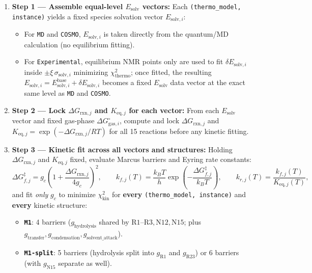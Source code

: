 \documentclass[11pt,a4paper]{article}
\begin{document}
\begin{enumerate}[leftmargin=1.8em]
    \item \textbf{Step 1 --- Assemble equal-level $E_{\text{solv}}$ vectors:} Each \texttt{(thermo\_model, instance)} yields a fixed species solvation vector $E_{\text{solv}, i}$:
    \begin{itemize}[leftmargin=1.5em]
        \item For \texttt{MD} and \texttt{COSMO}, $E_{\text{solv}, i}$ is taken directly from the quantum/MD calculation (no equilibrium fitting).
        \item For \texttt{Experimental}, equilibrium NMR points only are used to fit $\delta E_{\text{solv}, i}$ inside $\pm \xi\,\sigma_{\text{solv}, i}$ minimizing $\chi^2_{\text{thermo}}$; once fitted, the resulting $E_{\text{solv}, i} = E_{\text{solv}, i}^{\text{base}} + \delta E_{\text{solv}, i}$ becomes a fixed $E_{\text{solv}}$ data vector at the exact same level as \texttt{MD} and \texttt{COSMO}.
    \end{itemize}
    \item \textbf{Step 2 --- Lock $\Delta G_{\text{rxn}, j}$ and $K_{\text{eq}, j}$ for each vector:} From each $E_{\text{solv}}$ vector and fixed gas-phase $\Delta G_{\text{gas}, i}^\circ$, compute and lock $\Delta G_{\mathrm{rxn}, j}$ and $K_{\mathrm{eq}, j} = \exp(-\Delta G_{\mathrm{rxn}, j}/RT)$ for all 15 reactions before any kinetic fitting.
    \item \textbf{Step 3 --- Kinetic fit across all vectors and structures:} Holding $\Delta G_{\mathrm{rxn}, j}$ and $K_{\mathrm{eq}, j}$ fixed, evaluate Marcus barriers and Eyring rate constants:
    \[
        \Delta G_{f, j}^\ddagger = g_c \left(1 + \frac{\Delta G_{\mathrm{rxn}, j}}{4 g_c}\right)^2,
        \qquad
        k_{f, j}(T) = \frac{k_B T}{h} \exp\!\left(-\frac{\Delta G_{f, j}^\ddagger}{k_B T}\right),
        \qquad
        k_{r, j}(T) = \frac{k_{f, j}(T)}{K_{\mathrm{eq}, j}(T)},
    \]
    and fit \emph{only} $g_c$ to minimize $\chi^2_{\text{kin}}$ for \textbf{every} \texttt{(thermo\_model, instance)} and \textbf{every} kinetic structure:
    \begin{itemize}[leftmargin=1.5em]
        \item \textbf{\texttt{M1}}: 4 barriers ($g_{\text{hydrolysis}}$ shared by $\text{R1}$--$\text{R3}, \text{N12}, \text{N15}$; plus $g_{\text{transfer}}, g_{\text{condensation}}, g_{\text{solvent\_attack}}$).
        \item \textbf{\texttt{M1-split}}: 5 barriers (hydrolysis split into $g_{\text{R1}}$ and $g_{\text{R23}}$) or 6 barriers (with $g_{\text{N15}}$ separate as well).

\end{itemize}
\end{enumerate}
\end{document}
